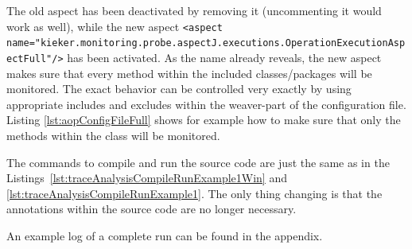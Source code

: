 \setXMLListing


\noindent The old aspect has been deactivated by removing it (uncommenting it would work as well), while the new aspect \lstinline$<aspect name="kieker.monitoring.probe.aspectJ.executions.OperationExecutionAspectFull"/>$ has been activated. As the name already reveals, the new aspect makes sure that every method within the included classes/packages will be monitored. The exact behavior can be controlled very exactly by using appropriate includes and excludes within the weaver-part of the configuration file. Listing \ref{lst:aopConfigFileFull} shows for example how to make sure that only the methods within the class  will be monitored.

The commands to compile and run the source code are just the same as in the Listings~\ref{lst:traceAnalysisCompileRunExample1Win} and \ref{lst:traceAnalysisCompileRunExample1}. The only thing changing is that the annotations within the source code are no longer necessary.

An example log of a complete run can be found in the appendix.

